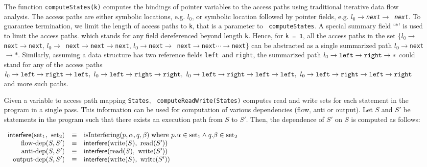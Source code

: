 \documentclass{IOS-Book-Article}
\newcommand{\loc}{\ensuremath{l_0}}
\newcommand{\mynext}{\mbox{\tt next}}
\newcommand{\lt}{\mbox{\tt left}}
\newcommand{\rt}{\mbox{\tt right}}
\newcommand{\isInterfering}{\mbox{isInterfering}}
\newcommand{\interf}[2]{\mbox{\sf interfere}(#1,\ #2)}
\begin{document}
  The function {\tt computeStates(k)} computes the
  bindings of pointer variables to the access paths using
  traditional iterative data flow analysis.  The access
  paths are either symbolic locations, e.g. $\loc$, or
  symbolic location followed by pointer fields, e.g.
  $\loc\rightarrow$\emph\mynext$\rightarrow$\emph{\tt
    next}. To guarantee termination, we limit the length of
  access paths to {\tt k}, that is a parameter to {\tt
    computeStates}. A special summary field `{$*$}' is used
  to limit the access paths. which stands for any field
  dereferenced beyond length {\tt k}. Hence, for {\tt k =
    1}, all the access paths in the set
  \{\loc$\rightarrow${\tt next}$\rightarrow$\mynext,
  \loc$\rightarrow${\tt
    next}$\rightarrow$\mynext$\rightarrow$\mynext,
  \loc$\rightarrow$\mynext$\rightarrow${\tt
    next}$\rightarrow$\mynext$\cdots\rightarrow${\tt next}\}
  can be abstracted as a single summarized path
  \loc$\rightarrow$\mynext$\rightarrow{*}$. Similarly,
  assuming a data structure has two reference fields
  \lt\ and \rt, the summarized path
  $\loc\rightarrow\lt\rightarrow\rt\rightarrow{*}$ could
  stand for any of the access paths
  $\loc\rightarrow\lt\rightarrow\rt\rightarrow\lt,\ \loc\rightarrow\lt\rightarrow\rt\rightarrow\rt,\ \loc\rightarrow\lt\rightarrow\rt\rightarrow\lt\rightarrow\lt,\ \loc\rightarrow\lt\rightarrow\rt\rightarrow\lt\rightarrow\rt$
  and more such paths.
  
  Given a variable to access path mapping {\tt States}, {\tt
    computeReadWrite(States)} computes read and 
  write sets for each statement in the program in a single
  pass. This information can be used for computation of various
  dependencies (flow, anti
  or output). Let $S$ and $S'$ be statements in the program
such that there exists an execution path from $S$ to
$S'$. Then, the dependence of $S'$ on $S$ is computed as
follows: \\
\newcommand{\flowdep}{\mbox{flow-dep}}
\newcommand{\antidep}{\mbox{anti-dep}}
\newcommand{\outputdep}{\mbox{output-dep}}
\newcommand{\rs}[1]{\mbox{read}(#1)}
\newcommand{\ws}[1]{\mbox{write}(#1)}
\newcommand{\rst}[2]{\mbox{read}(#1, #2)}
\newcommand{\wst}[2]{\mbox{write}(#1, #2)}
\newcommand{\set}{\mbox{set}}
\noindent

$\begin{array}{rcl}
\interf{\set_1}{\set_2} &\equiv& \isInterfering(p, \alpha, q,
\beta) \; \mbox{where } 
p.\alpha \in \set_1   \wedge  q.\beta \in \set_2 \\ 
\flowdep(S, S') &\equiv& \interf{\ws{S}}{\rs{S'}} \\ 
\antidep(S, S') &\equiv& \interf{\rs{S}}{\ws{S'}} \\
\outputdep(S, S') &\equiv& \interf{\ws{S}}{\ws{S'}}
\end{array}$ \\
\end{document}
